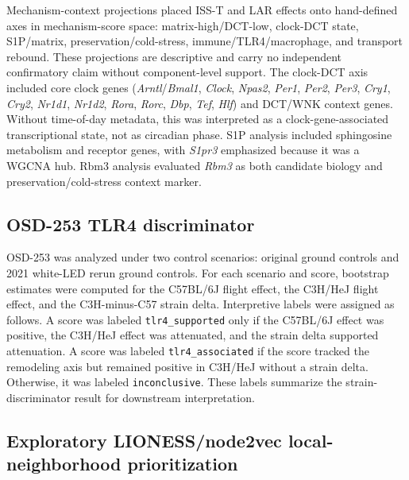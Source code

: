 \documentclass[11pt]{article}
\newcommand{\code}[1]{\texttt{#1}}
\newcommand{\gene}[1]{\textit{#1}}
\begin{document}
Mechanism-context projections placed ISS-T and LAR effects onto hand-defined axes in mechanism-score space: matrix-high/DCT-low, clock-DCT state, S1P/matrix, preservation/cold-stress, immune/TLR4/macrophage, and transport rebound. These projections are descriptive and carry no independent confirmatory claim without component-level support. The clock-DCT axis included core clock genes (\gene{Arntl}/\gene{Bmal1}, \gene{Clock}, \gene{Npas2}, \gene{Per1}, \gene{Per2}, \gene{Per3}, \gene{Cry1}, \gene{Cry2}, \gene{Nr1d1}, \gene{Nr1d2}, \gene{Rora}, \gene{Rorc}, \gene{Dbp}, \gene{Tef}, \gene{Hlf}) and DCT/WNK context genes. Without time-of-day metadata, this was interpreted as a clock-gene-associated transcriptional state, not as circadian phase. S1P analysis included sphingosine metabolism and receptor genes, with \gene{S1pr3} emphasized because it was a WGCNA hub. Rbm3 analysis evaluated \gene{Rbm3} as both candidate biology and preservation/cold-stress context marker.

\subsection{OSD-253 TLR4 discriminator}

OSD-253 was analyzed under two control scenarios: original ground controls and 2021 white-LED rerun ground controls. For each scenario and score, bootstrap estimates were computed for the C57BL/6J flight effect, the C3H/HeJ flight effect, and the C3H-minus-C57 strain delta. Interpretive labels were assigned as follows. A score was labeled \code{tlr4\_supported} only if the C57BL/6J effect was positive, the C3H/HeJ effect was attenuated, and the strain delta supported attenuation. A score was labeled \code{tlr4\_associated} if the score tracked the remodeling axis but remained positive in C3H/HeJ without a strain delta. Otherwise, it was labeled \code{inconclusive}. These labels summarize the strain-discriminator result for downstream interpretation.

\subsection{Exploratory LIONESS/node2vec local-neighborhood prioritization}
\end{document}

